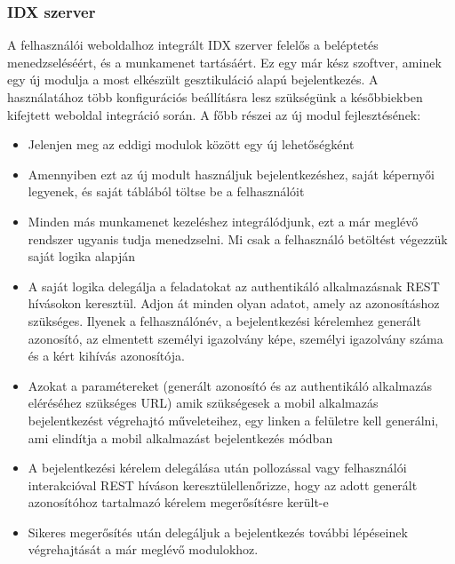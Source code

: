 \subsubsection{IDX szerver}
A felhasználói weboldalhoz integrált IDX szerver felelős a beléptetés menedzseléséért, és a munkamenet tartásáért. Ez egy már kész szoftver, aminek egy új modulja a most elkészült gesztikuláció alapú bejelentkezés. A használatához több konfigurációs beállításra lesz szükségünk a későbbiekben kifejtett weboldal integráció során. A főbb részei az új modul fejlesztésének: 
\begin{itemize}
\item Jelenjen meg az eddigi modulok között egy új lehetőségként
\item Amennyiben ezt az új modult használjuk bejelentkezéshez, saját képernyői legyenek, és saját táblából töltse be a felhasználóit
\item Minden más munkamenet kezeléshez integrálódjunk, ezt a már meglévő rendszer ugyanis tudja menedzselni. Mi csak a felhasználó betöltést végezzük saját logika alapján
\item A saját logika delegálja a feladatokat az authentikáló alkalmazásnak REST hívásokon keresztül. Adjon át minden olyan adatot, amely az azonosításhoz szükséges. Ilyenek a felhasználónév, a bejelentkezési kérelemhez generált azonosító, az elmentett személyi igazolvány képe, személyi igazolvány száma és a kért kihívás azonosítója.
\item Azokat a paramétereket (generált azonosító és az authentikáló alkalmazás eléréséhez szükséges URL) amik szükségesek a mobil alkalmazás bejelentkezést végrehajtó műveleteihez, egy linken a felületre kell generálni, ami elindítja a mobil alkalmazást bejelentkezés módban
\item A bejelentkezési kérelem delegálása után pollozással vagy felhasználói interakcióval REST híváson keresztülellenőrizze, hogy az adott generált azonosítóhoz tartalmazó kérelem megerősítésre került-e
\item Sikeres megerősítés után delegáljuk a bejelentkezés további lépéseinek végrehajtását a már meglévő modulokhoz.
\end{itemize}

